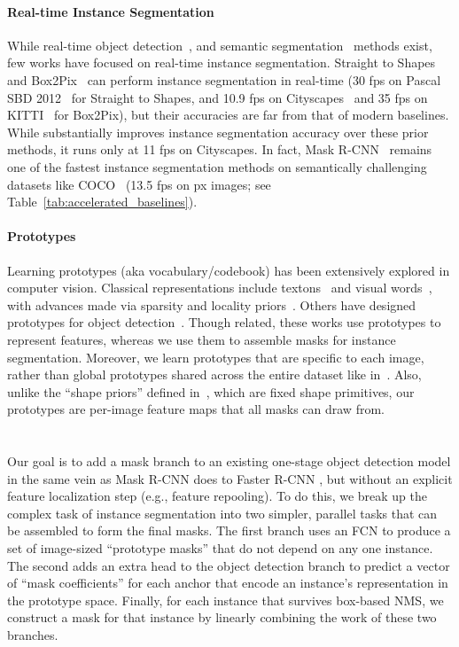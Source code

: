 \documentclass[10pt,journal,compsoc]{IEEEtran}
\begin{document}
\paragraph{Real-time Instance Segmentation}
While real-time object detection~\cite{ssd,yolov1,yolov2,yolov3}, and semantic segmentation~\cite{segnet,treml2016sq,enet,blitznet,zhao2018icnet} methods exist, few works have focused on real-time instance segmentation.  Straight to Shapes~\cite{straight2shapes} and Box2Pix~\cite{box2pix} can perform instance segmentation in real-time (30 fps on Pascal SBD 2012~\cite{pascalvoc,sbd} for Straight to Shapes, and 10.9 fps on Cityscapes~\cite{cityscape} and 35 fps on KITTI~\cite{KITTI} for Box2Pix), but their accuracies are far from that of modern baselines. While \cite{neven2019instance} substantially improves instance segmentation accuracy over these prior methods, it runs only at 11 fps on Cityscapes. In fact, Mask R-CNN~\cite{maskrcnn} remains one of the fastest instance segmentation methods on semantically challenging datasets like COCO~\cite{coco} (13.5 fps on  px images; see Table~\ref{tab:accelerated_baselines}).


\paragraph{Prototypes}
Learning prototypes (aka vocabulary/codebook) has been extensively explored in computer vision. Classical representations include textons~\cite{textons} and visual words~\cite{sivic-iccv2003}, with advances made via sparsity and locality priors~\cite{yang-tip2010,wang-cvpr2010,zhang-iccv2013}. Others have designed prototypes for object detection~\cite{agarwal-eccv2002,yu-bmvc2007,ren-cvpr2013}. Though related, these works use prototypes to represent features, whereas we use them to assemble masks for instance segmentation. Moreover, we learn prototypes that are specific to each image, rather than global prototypes shared across the entire dataset like in~\cite{arnab-cvpr2017}. Also, unlike the ``shape priors'' defined in~\cite{arnab-cvpr2017}, which are fixed shape primitives, our prototypes are per-image feature maps that all masks can draw from.

\section{\methodname}

Our goal is to add a mask branch to an existing one-stage object detection model in the same vein as Mask R-CNN \cite{maskrcnn} does to Faster R-CNN \cite{fasterrcnn}, but without an explicit feature localization step (e.g., feature repooling). To do this, we break up the complex task of instance segmentation into two simpler, parallel tasks that can be assembled to form the final masks. The first branch uses an FCN \cite{fcn} to produce a set of image-sized ``prototype masks'' that do not depend on any one instance. The second adds an extra head to the object detection branch to predict a vector of ``mask coefficients'' for each anchor that encode an instance's representation in the prototype space. Finally, for each instance that survives box-based NMS, we construct a mask for that instance by linearly combining the work of these two branches.
\end{document}

